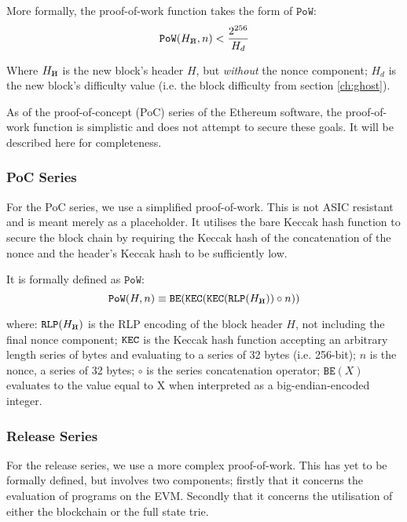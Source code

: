 \documentclass[9pt,oneside]{amsart}
\newcommand{\hcancel}[1]{%
    \tikz[baseline=(tocancel.base)]{
        \node[inner sep=0pt,outer sep=0pt] (tocancel) {#1};
        \draw[black] (tocancel.south west) -- (tocancel.north east);
    }%
}%
\begin{document}
\begin{multicols}{2}
More formally, the proof-of-work function takes the form of $\mathtt{PoW}$:
\begin{equation}
\mathtt{PoW}(H_{\hcancel{n}}, n) < \frac{2^{256}}{H_d}
\end{equation}

Where $H_{\hcancel{n}}$ is the new block's header $H$, but \textit{without} the nonce component; $H_d$ is the new block's difficulty value (i.e. the block difficulty from section \ref{ch:ghost}).

As of the proof-of-concept (PoC) series of the Ethereum software, the proof-of-work function is simplistic and does not attempt to secure these goals. It will be described here for completeness.

\subsubsection{PoC Series}

For the PoC series, we use a simplified proof-of-work. This is not ASIC resistant and is meant merely as a placeholder. It utilises the bare Keccak hash function to secure the block chain by requiring the Keccak hash of the concatenation of the nonce and the header's Keccak hash to be sufficiently low.

It is formally defined as $\mathtt{PoW}$:
\begin{equation}
\mathtt{PoW}(H, n) \equiv \mathtt{BE}(\mathtt{\tiny KEC}(\mathtt{\tiny KEC}(\mathtt{\tiny RLP}(H_{\hcancel{n}})) \circ n))
\end{equation}

where:
$\mathtt{\tiny RLP}(H_{\hcancel{n}})$ is the RLP encoding of the block header $H$, not including the final nonce component;
$\mathtt{\tiny KEC}$ is the Keccak hash function accepting an arbitrary length series of bytes and evaluating to a series of 32 bytes (i.e. 256-bit);
$n$ is the nonce, a series of 32 bytes;
$\circ$ is the series concatenation operator;
$\mathtt{BE}(X)$ evaluates to the value equal to X when interpreted as a big-endian-encoded integer.

\subsubsection{Release Series}

For the release series, we use a more complex proof-of-work. This has yet to be formally defined, but involves two components; firstly that it concerns the evaluation of programs on the EVM. Secondly that it concerns the utilisation of either the blockchain or the full state trie.


\end{multicols}
\end{document}
